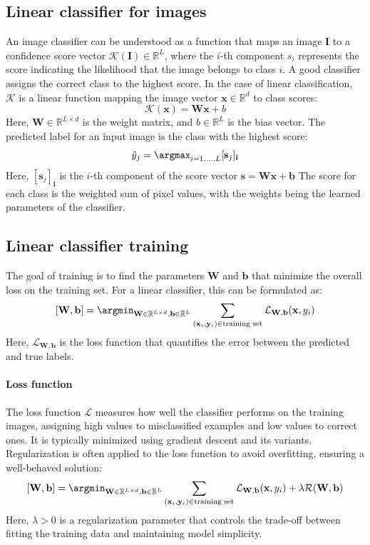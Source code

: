 \subsection{Linear classifier for images}
An image classifier can be understood as a function that maps an image $\mathbf{I}$ to a confidence score vector $\mathcal{K}(\mathbf{I})\in\mathbb{R}^L$, where the $i$-th component $s_i$ represents the score indicating the likelihood that the image belongs to class $i$.
A good classifier assigns the correct class to the highest score.
In the case of linear classification, $\mathcal{K}$ is a linear function mapping the image vector $\mathbf{x}\in\mathbb{R}^d$ to class scores:
\[\mathcal{K}(\mathbf{x})=\mathbf{Wx}+b\]
Here, $\mathbf{W}\in\mathbb{R}^{L\times d}$ is the weight matrix, and $b\in\mathbb{R}^L$ is the bias vector. 
The predicted label for an input image is the class with the highest score:
\[\hat{y}_j=\argmax_{i=1,\dots,L}[\mathbf{s}_j]_\mathbf{i}\]
Here, $[\mathbf{s}_j]_\mathbf{i}$ is the $i$-th component of the score vector $\mathbf{s}=\mathbf{Wx}+\mathbf{b}$
The score for each class is the weighted sum of pixel values, with the weights being the learned parameters of the classifier.

\subsection{Linear classifier training}
The goal of training is to find the parameters $\mathbf{W}$ and $\mathbf{b}$ that minimize the overall loss on the training set.
For a linear classifier, this can be formulated as:
\[[\mathbf{W},\mathbf{b}]=\argmin_{\mathbf{W}\in\mathbb{R}^{L\times d},\mathbf{b}\in\mathbb{R}^L}\sum_{(\mathbf{x}_i,\mathbf{y}_i)\in\text{training set}}\mathcal{L}_{\mathbf{W},\mathbf{b}}(\mathbf{x},y_i)\]
Here, $\mathcal{L}_{\mathbf{W},\mathbf{b}}$ is the loss function that quantifies the error between the predicted and true labels.

\paragraph*{Loss function}
The loss function $\mathcal{L}$ measures how well the classifier performs on the training images, assigning high values to misclassified examples and low values to correct ones.
It is typically minimized using gradient descent and its variants. 
Regularization is often applied to the loss function to avoid overfitting, ensuring a well-behaved solution:
\[[\mathbf{W},\mathbf{b}]=\argmin_{\mathbf{W}\in\mathbb{R}^{L\times d},\mathbf{b}\in\mathbb{R}^L}\sum_{(\mathbf{x}_i,\mathbf{y}_i)\in\text{training set}}\mathcal{L}_{\mathbf{W},\mathbf{b}}(\mathbf{x},y_i)+\lambda\mathcal{R}(\mathbf{W},\mathbf{b})\]
Here, $\lambda>0$ is a regularization parameter that controls the trade-off between fitting the training data and maintaining model simplicity.


